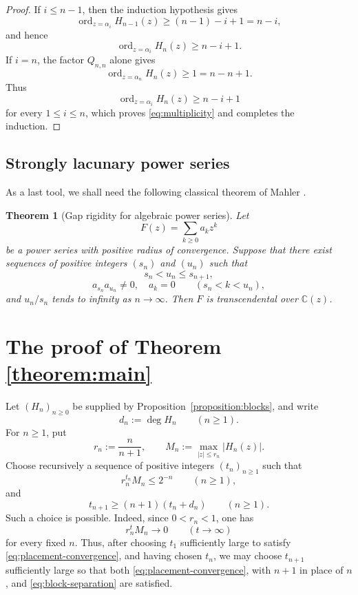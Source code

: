 \documentclass[10pt]{amsart}
\newtheorem{theorem}{Theorem}[section]
\theoremstyle{definition}
\theoremstyle{remark}
\numberwithin{equation}{section}
\newcommand{\C}{\mathbb C}
\newcommand{\abs}[1]{\lvert #1\rvert}
\newcommand{\ord}{\operatorname{ord}}
\begin{document}
\begin{proof}
If $i\leq n-1$, then the induction hypothesis gives
\[
        \ord_{z=\alpha_i}H_{n-1}(z)
        \geq
        (n-1)-i+1
        =
        n-i,
\]
and hence
\[
        \ord_{z=\alpha_i}H_n(z)
        \geq
        n-i+1.
\]
If $i=n$, the factor $Q_{n,n}$ alone gives
\[
        \ord_{z=\alpha_n}H_n(z)
        \geq1
        =
        n-n+1.
\]
Thus
\[
        \ord_{z=\alpha_i}H_n(z)\geq n-i+1
\]
for every $1\leq i\leq n$, which proves
\eqref{eq:multiplicity} and completes the induction.
\end{proof}


\subsection{Strongly lacunary power series}

As a last tool, we shall need the following classical theorem of Mahler
\cite[Chapter~II]{mahler1976}.

\begin{theorem}[Gap rigidity for algebraic power series]\label{theorem:mahler-lacunary}
Let
\[
        F(z)=\sum_{k\geq0}a_kz^k
\]
be a power series with positive radius of convergence. Suppose that there exist sequences of positive
integers $(s_n)$ and $(u_n)$ such that
\[
        s_n<u_n\leq s_{n+1},
\]
\[
       a_{s_n}a_{u_n}\neq 0, \quad a_k=0
        \qquad(s_n<k<u_n),
\]
and $u_n/s_n$ tends to infinity as $n\to \infty$. Then $F$ is transcendental over $\C(z)$.
\end{theorem}

\section{The proof of Theorem \ref{theorem:main}}

Let $(H_n)_{n\geq0}$ be supplied by Proposition~\ref{proposition:blocks},
and write
\[
        d_n:=\deg H_n
        \qquad(n\geq1).
\]
For $n\geq1$, put
\[
        r_n:=\frac{n}{n+1},
        \qquad
        M_n:=\max_{\abs z\leq r_n}\abs{H_n(z)}.
\]
Choose recursively a sequence of positive integers $(t_n)_{n\geq1}$ such that
\begin{equation}\label{eq:placement-convergence}
        r_n^{t_n}M_n\leq 2^{-n}
        \qquad(n\geq1),
\end{equation}
and
\begin{equation}\label{eq:block-separation}
        t_{n+1}\geq (n+1)(t_n+d_n)
        \qquad(n\geq1).
\end{equation}
Such a choice is possible. Indeed, since $0<r_n<1$, one has
\[
        r_n^tM_n\longrightarrow0
        \qquad(t\to\infty)
\]
for every fixed $n$. Thus, after choosing $t_1$ sufficiently large to
satisfy \eqref{eq:placement-convergence}, and having chosen $t_n$, we may
choose $t_{n+1}$ sufficiently large so that both
\eqref{eq:placement-convergence}, with $n+1$ in place of $n$, and
\eqref{eq:block-separation} are satisfied.
\end{document}
